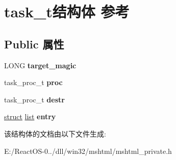 \hypertarget{structtask__t}{}\section{task\+\_\+t结构体 参考}
\label{structtask__t}
\subsection*{Public 属性}
\begin{DoxyCompactItemize}
\item 
\mbox{\label{structtask__t_ac89e146ad1e84166037a8ae1d3e1ec50}} 
L\+O\+NG {\bfseries target\+\_\+magic}
\item 
\mbox{\label{structtask__t_a2df00fbb00a9b41afa197dbb5a47837e}} 
task\+\_\+proc\+\_\+t {\bfseries proc}
\item 
\mbox{\label{structtask__t_a844ac410208c37145eb603ee36b74aae}} 
task\+\_\+proc\+\_\+t {\bfseries destr}
\item 
\mbox{\label{structtask__t_aa0268ea4918e011726b5b8e27c2b87f4}} 
\hyperlink{interfacestruct}{struct} \hyperlink{classlist}{list} {\bfseries entry}
\end{DoxyCompactItemize}


该结构体的文档由以下文件生成\+:\begin{DoxyCompactItemize}
\item 
E\+:/\+React\+O\+S-\/0../dll/win32/mshtml/mshtml\+\_\+private.\+h\end{DoxyCompactItemize}
